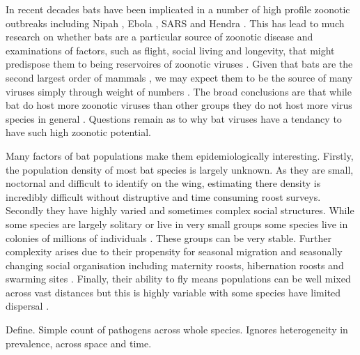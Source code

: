 In recent decades bats have been implicated in a number of high profile zoonotic outbreaks including Nipah \cite{field2001natural}, Ebola \cite{leroy2005fruit}, SARS \cite{li2005bats} and Hendra \cite{field2001natural}.
This has lead to much research on whether bats are a particular source of zoonotic disease \cite{luis2013comparison, olival2015bats, wang2011mass} and examinations of factors, such as flight, social living and longevity, that might predispose them to being reservoires of zoonotic viruses \cite{calisher2006bats, o2014bat, dobson2005links}.
Given that bats are the second largest order of mammals \cite{wilson2005mammal}, we may expect them to be the source of many viruses simply through weight of numbers \cite{luis2013comparison}.
The broad conclusions are that while bat do host more zoonotic viruses than other groups \cite{luis2013comparison} they do not host more virus species in general \cite{olival2015bats}.
Questions remain as to why bat viruses have a tendancy to have such high zoonotic potential.

Many factors of bat populations make them epidemiologically interesting.
Firstly, the population density of most bat species is largely unknown.
As they are small, noctornal and difficult to identify on the wing, estimating there density is incredibly difficult without distruptive and time consuming roost surveys.
Secondly they have highly varied and sometimes complex social structures.
While some species are largely solitary \cite{} or live in very small groups \cite{} some species live in colonies of millions of individuals \cite{}.
These groups can be very stable.
Further complexity arises due to their propensity for seasonal migration \cite{} and seasonally changing social organisation including maternity roosts, hibernation roosts and swarming sites \cite{}.
Finally, their ability to fly means populations can be well mixed across vast distances \cite{peel2013continent} but this is highly variable with some species have limited dispersal \cite{}.







Define.
Simple count of pathogens across whole species.
Ignores heterogeneity in prevalence, across space and time.








